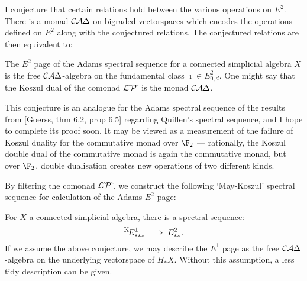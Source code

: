 \documentclass[11pt]{article}
\newcommand{\Sq}{\mathrm{Sq}}
\begin{document}
I conjecture that certain relations hold between the various operations on $E^2$. There is a monad $\mathcal{C}\mathcal{A}\Delta$ on bigraded vectorspaces which encodes the operations defined on $E^2$ along with the conjectured relations. The conjectured relations are then equivalent to:
\begin{conjecture}
The $E^2$ page of the Adams spectral sequence for a connected simplicial algebra $X$ is the free $\mathcal{C}\mathcal{A}\Delta$-algebra on the fundamental class $\imath\in E^2_{0,d}$. One might say that the Koszul dual of the comonad $\mathcal{L}\hat{\,}\mathcal{P}\hat{\,}$ is the monad $\mathcal{C}\mathcal{A}\Delta$.
\end{conjecture}
This conjecture is an analogue for the Adams spectral sequence of the results from [Goerss, thm 6.2, prop 6.5] regarding Quillen's spectral sequence, and I hope to complete its proof soon. %
%
%
It may be viewed as a measurement of the failure of Koszul duality for the commutative monad over $\F_2$ --- rationally, the Koszul double dual of the commutative monad is again the commutative monad, but over $\F_2$, double dualisation creates new operations of two different kinds.

By filtering the comonad $\mathcal{L}{\hat\,}\mathcal{P}{\hat\,}$, we construct the following `May-Koszul' spectral sequence for calculation of the Adams $E^2$ page:
\begin{thm*}
For $X$ a connected simplicial algebra, there is a spectral sequence:
\[{^{\textup{K}\!}}E^1_{***}\implies E^2_{**}.\]
If we assume the above conjecture, we may describe the $E^1$ page as the free $\mathcal{C}\mathcal{A}\Delta$-algebra on the underlying vectorspace of $H_*X$. Without this assumption, a less tidy description can be given.
\end{thm*}
\end{document}
